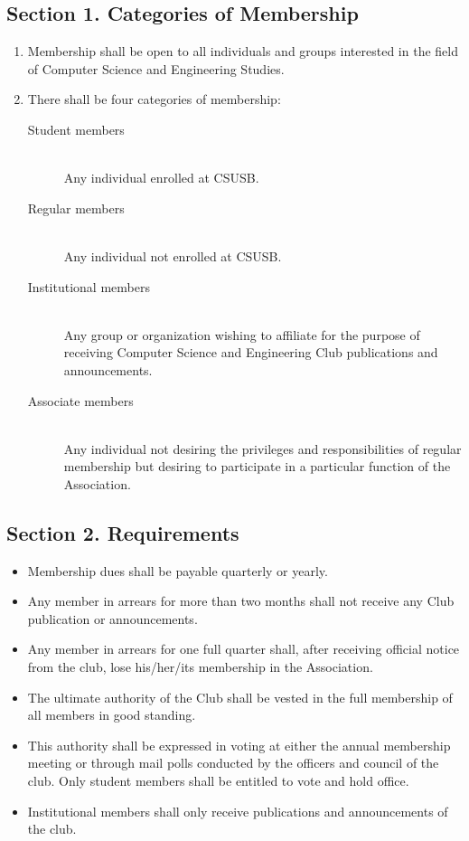 \documentclass{article}
\begin{document}
  \subsection{Section 1. Categories of Membership}
    \begin{enumerate}
      \item Membership shall be open to all individuals and groups interested in the field of Computer Science and Engineering Studies.
      \item There shall be four categories of membership:
      \begin{description}
        \item[Student members] ~\\
          Any individual enrolled at CSUSB.
        \item[Regular members] ~\\
          Any individual not enrolled at CSUSB.
        \item[Institutional members] ~\\
          Any group or organization wishing to affiliate for the purpose of receiving Computer Science and Engineering Club publications and announcements.
        \item[Associate members] ~\\
          Any individual not desiring the privileges and responsibilities of regular membership but desiring to participate in a particular function of the Association.
      \end{description}
    \end{enumerate}

  \subsection{Section 2. Requirements}
    \begin{itemize}
      \item Membership dues shall be payable quarterly or yearly.
      \item Any member in arrears for more than two months shall not receive any Club publication or announcements.
      \item Any member in arrears for one full quarter shall, after receiving official notice from the club, lose his/her/its membership in the Association.
      \item The ultimate authority of the Club shall be vested in the full membership of all members in good standing.
      \item This authority shall be expressed in voting at either the annual membership meeting or through mail polls conducted by the officers and council of the club. Only student members shall be entitled to vote and hold office.
      \item Institutional members shall only receive publications and announcements of the club.
    \end{itemize}
\end{document}
